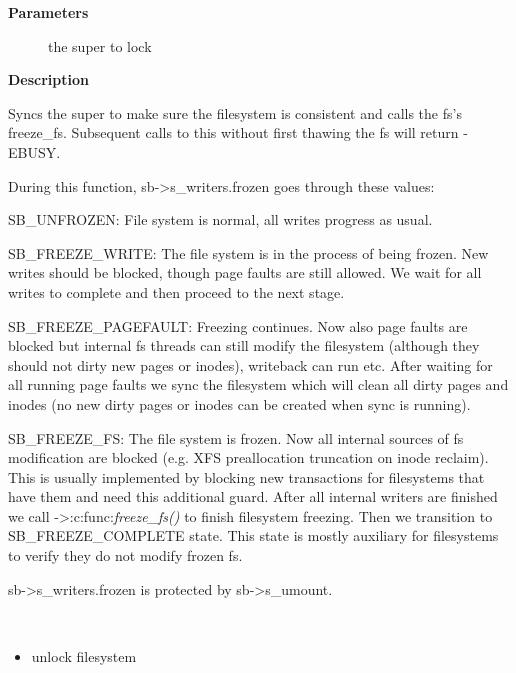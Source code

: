 \documentclass[a4paper,8pt,english]{sphinxmanual}
\begin{document}
\textbf{Parameters}
\begin{description}
\item[{}] \leavevmode
the super to lock

\end{description}

\textbf{Description}

Syncs the super to make sure the filesystem is consistent and calls the fs's
freeze\_fs.  Subsequent calls to this without first thawing the fs will return
-EBUSY.

During this function, sb-\textgreater{}s\_writers.frozen goes through these values:

SB\_UNFROZEN: File system is normal, all writes progress as usual.

SB\_FREEZE\_WRITE: The file system is in the process of being frozen.  New
writes should be blocked, though page faults are still allowed. We wait for
all writes to complete and then proceed to the next stage.

SB\_FREEZE\_PAGEFAULT: Freezing continues. Now also page faults are blocked
but internal fs threads can still modify the filesystem (although they
should not dirty new pages or inodes), writeback can run etc. After waiting
for all running page faults we sync the filesystem which will clean all
dirty pages and inodes (no new dirty pages or inodes can be created when
sync is running).

SB\_FREEZE\_FS: The file system is frozen. Now all internal sources of fs
modification are blocked (e.g. XFS preallocation truncation on inode
reclaim). This is usually implemented by blocking new transactions for
filesystems that have them and need this additional guard. After all
internal writers are finished we call -\textgreater{}:c:func:\emph{freeze\_fs()} to finish filesystem
freezing. Then we transition to SB\_FREEZE\_COMPLETE state. This state is
mostly auxiliary for filesystems to verify they do not modify frozen fs.

sb-\textgreater{}s\_writers.frozen is protected by sb-\textgreater{}s\_umount.

\begin{fulllineitems}
\label{filesystems/index:c.thaw_super}~\begin{itemize}
\item {} 
unlock filesystem

\end{itemize}

\end{fulllineitems}
\end{document}
